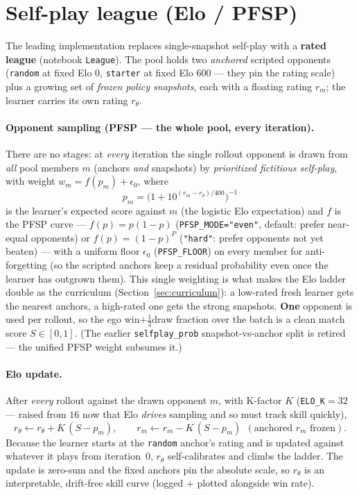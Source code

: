 \documentclass[11pt]{article}
\begin{document}
\section{Self-play league (Elo / PFSP)}\label{sec:league}
The leading implementation replaces single-snapshot self-play with a \textbf{rated league} (notebook
\texttt{League}). The pool holds two \emph{anchored} scripted opponents (\texttt{random} at fixed Elo
$0$, \texttt{starter} at fixed Elo $600$ --- they pin the rating scale) plus a growing set of
\emph{frozen policy snapshots}, each with a floating rating $r_m$; the learner carries its own rating
$r_\theta$.

\paragraph{Opponent sampling (PFSP --- the whole pool, every iteration).} There are no stages: at
\emph{every} iteration the single rollout opponent is drawn from \emph{all} pool members $m$ (anchors
\emph{and} snapshots) by \emph{prioritized fictitious self-play}, with weight $w_m=f(p_m)+\epsilon_0$,
where
\begin{equation}
p_m=\Big(1+10^{(r_m-r_\theta)/400}\Big)^{-1}
\end{equation}
is the learner's expected score against $m$ (the logistic Elo expectation) and $f$ is the PFSP curve ---
$f(p)=p(1-p)$ (\texttt{PFSP\_MODE="even"}, default: prefer near-equal opponents) or $f(p)=(1-p)^{P}$
(\texttt{"hard"}: prefer opponents not yet beaten) --- with a uniform floor $\epsilon_0$
(\texttt{PFSP\_FLOOR}) on every member for anti-forgetting (so the scripted anchors keep a residual
probability even once the learner has outgrown them). This single weighting is what makes the Elo ladder
double as the curriculum (Section~\ref{sec:curriculum}): a low-rated fresh learner gets the nearest
anchors, a high-rated one gets the strong snapshots. \textbf{One} opponent is used per rollout, so the
ego win$+\tfrac12$draw fraction over the batch is a clean match score $S\in[0,1]$. (The earlier
\texttt{selfplay\_prob} snapshot-vs-anchor split is retired --- the unified PFSP weight subsumes it.)

\paragraph{Elo update.} After \emph{every} rollout against the drawn opponent $m$, with K-factor $K$
(\texttt{ELO\_K}$=32$ --- raised from $16$ now that Elo \emph{drives} sampling and so must track skill
quickly),
\begin{equation}
r_\theta \leftarrow r_\theta + K\,(S-p_m),\qquad
r_m \leftarrow r_m - K\,(S-p_m)\ \ (\text{anchored }r_m\text{ frozen}).
\end{equation}
Because the learner starts at the \texttt{random} anchor's rating and is updated against whatever it
plays from iteration~0, $r_\theta$ self-calibrates and climbs the ladder. The update is zero-sum and the
fixed anchors pin the absolute scale, so $r_\theta$ is an interpretable, drift-free skill curve (logged
$+$ plotted alongside win rate).
\end{document}

